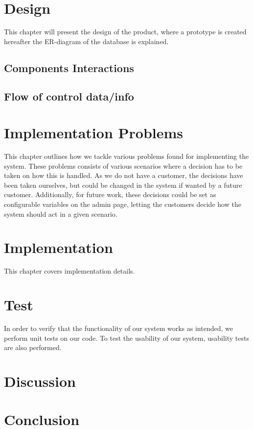 	\chapter{Design}
	This chapter will present the design of the product, where a prototype is created hereafter the ER-diagram of the database is explained.
	
	
	
	
	\section{Components Interactions}
	\section{Flow of control data/info}
	
	\chapter{Implementation Problems}
	This chapter outlines how we tackle various problems found for implementing the system.
	These problems consists of various scenarios where a decision has to be taken on how this is handled.
	As we do not have a customer, the decisions have been taken ourselves, but could be changed in the system if wanted by a future customer.
	Additionally, for future work, these decisions could be set as configurable variables on the admin page, letting the customers decide how the system should act in a given scenario.
	
	
	\chapter{Implementation}
	This chapter covers implementation details.
	
	
	
	
	
	
	
	
	
	
	
	\chapter{Test}
	In order to verify that the functionality of our system works as intended, we perform unit tests on our code. 
    To test the usability of our system, usability tests are also performed.
	
	
	
	\chapter{Discussion}
	\chapter{Conclusion}
	
	\afterpage{\thispagestyle{empty}}

	
	
	\label{lastpagewithoutappendix}

	\appendix
	
	
	
	\cleardoublepage

